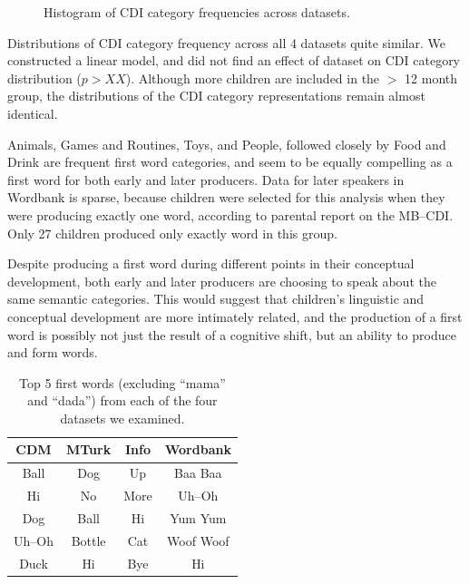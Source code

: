\documentclass[10pt,letterpaper]{article}
\begin{document}
\begin{figure}[tb]
\caption{\label{fig:cdfs} Histogram of CDI category frequencies across datasets.}
\end{figure}

Distributions of CDI category frequency across all 4 datasets quite similar. We constructed a linear model, and did not find an effect of dataset on CDI category distribution ($p > XX$). Although more children are included in the $>$ 12 month group, the distributions of the CDI category representations remain almost identical.

Animals, Games and Routines, Toys, and People, followed closely by Food and Drink are frequent first word categories, and seem to be equally compelling as a first word for both early and later producers. Data for later speakers in Wordbank is sparse, because children were selected for this analysis when they were producing exactly one word, according to parental report on the MB--CDI. Only 27 children produced only exactly word in this group.

Despite producing a first word during different points in their conceptual development, both early and later producers are choosing to speak about the same semantic categories. This would suggest that children's linguistic and conceptual development are more intimately related, and the production of a first word is possibly not just the result of a cognitive shift, but an ability to produce and form words.



\begin{table}[t]
\centering
\begin{tabular}{cccc}
\hline
{\bf CDM} & {\bf MTurk} & {\bf Info} & {\bf Wordbank} \\ 
\hline
Ball & Dog & Up & Baa Baa \\ 
Hi & No & More & Uh--Oh \\
Dog & Ball & Hi & Yum Yum \\ 
Uh--Oh & Bottle & Cat & Woof Woof \\ 
Duck & Hi & Bye & Hi \\ 
\hline 
\end{tabular}
\caption{\label{tab:top5} Top 5 first words (excluding ``mama'' and ``dada'') from each of the four datasets we examined.}
\end{table}
\end{document}
